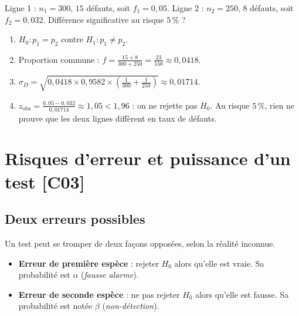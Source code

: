 \documentclass[a4paper,11pt]{article}
\begin{document}
\begin{exemple}
Ligne 1 : $n_1 = 300$, $15$ défauts, soit $f_1 = 0{,}05$. Ligne 2 : $n_2 = 250$, $8$ défauts, soit $f_2 = 0{,}032$. Différence significative au risque $5\,\%$ ?
\begin{enumerate}
  \item $H_0 : p_1 = p_2$ contre $H_1 : p_1 \neq p_2$.
  \item Proportion commune : $f = \frac{15 + 8}{300 + 250} = \frac{23}{550} \approx 0{,}0418$.
  \item $\sigma_D = \sqrt{0{,}0418 \times 0{,}9582 \times \left(\frac{1}{300} + \frac{1}{250}\right)} \approx 0{,}01714$.
  \item $z_{\text{obs}} = \frac{0{,}05 - 0{,}032}{0{,}01714} \approx 1{,}05 < 1{,}96$ : on ne rejette pas $H_0$. Au risque $5\,\%$, rien ne prouve que les deux lignes diffèrent en taux de défauts.
\end{enumerate}
\end{exemple}

\newpage
\section{Risques d'erreur et puissance d'un test \hfill {\normalsize\color{uimmred}[C03]}}

\subsection{Deux erreurs possibles}

Un test peut se tromper de deux façons opposées, selon la réalité inconnue.

\begin{definition}
\begin{itemize}
  \item \textbf{Erreur de première espèce} : rejeter $H_0$ alors qu'elle est vraie. Sa probabilité est $\alpha$ (\emph{fausse alarme}).
  \item \textbf{Erreur de seconde espèce} : ne pas rejeter $H_0$ alors qu'elle est fausse. Sa probabilité est notée $\beta$ (\emph{non-détection}).
\end{itemize}
\end{definition}
\end{document}
